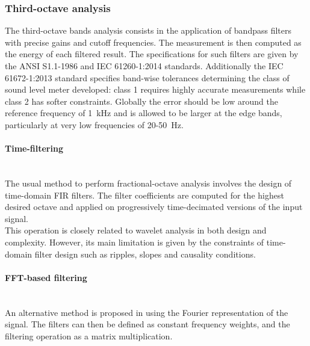 \documentclass[12pt,times,onecolumn]{article}
\begin{document}
\subsubsection{Third-octave analysis}
The third-octave bands analysis consists in the application of bandpass filters with precise gains and cutoff frequencies. The measurement is then computed as the energy of each filtered result. The specifications for such filters are given by the ANSI S1.1-1986 \cite{citeulike:9580295} and IEC 61260-1:2014 \cite{iec-norm} standards. Additionally the IEC 61672-1:2013 \cite{iec-norm2} standard specifies band-wise tolerances determining the class of sound level meter developed: class 1 requires highly accurate measurements while class 2 has softer constraints. Globally the error should be low around the reference frequency of 1~kHz and is allowed to be larger at the edge bands, particularly at very low frequencies of 20-50~Hz.

\paragraph{Time-filtering\\\\}
The usual method \cite{davis1986} to perform fractional-octave analysis involves the design of time-domain FIR filters. The filter coefficients are computed for the highest desired octave and applied on progressively time-decimated versions of the input signal.\\

This operation is closely related to wavelet analysis in both design and complexity. However, its main limitation is given by the constraints of time-domain filter design such as ripples, slopes and causality conditions.

\paragraph{FFT-based filtering\\\\}
An alternative method is proposed in \cite{antoni2010} using the Fourier representation of the signal. The filters can then be defined as constant frequency weights, and the filtering operation as a matrix multiplication.\\
\end{document}
